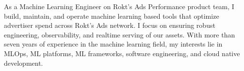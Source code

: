 

\begin{cvparagraph}
\begin{flushleft}
As a Machine Learning Engineer on Rokt's Ads Performance product team, I build, maintain, and operate machine learning based tools that optimize advertiser spend across Rokt's Ads network. I focus on ensuring robust engineering, observability, and realtime serving of our assets. With more than seven years of experience in the machine learning field, my interests lie in MLOps, ML platforms, ML frameworks, software engineering, and cloud native development.
\end{flushleft}
\end{cvparagraph}
